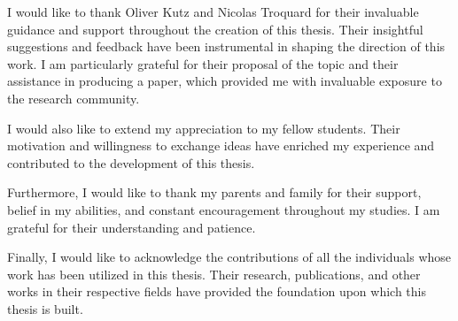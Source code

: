 
I would like to thank Oliver Kutz and Nicolas Troquard for their invaluable guidance and support throughout the creation of this thesis. Their insightful suggestions and feedback have been instrumental in shaping the direction of this work. I am particularly grateful for their proposal of the topic and their assistance in producing a paper, which provided me with invaluable exposure to the research community.

I would also like to extend my appreciation to my fellow students. Their motivation and willingness to exchange ideas have enriched my experience and contributed to the development of this thesis.

Furthermore, I would like to thank my parents and family for their support, belief in my abilities, and constant encouragement throughout my studies. I am grateful for their understanding and patience.

Finally, I would like to acknowledge the contributions of all the individuals whose work has been utilized in this thesis. Their research, publications, and other works in their respective fields have provided the foundation upon which this thesis is built.
